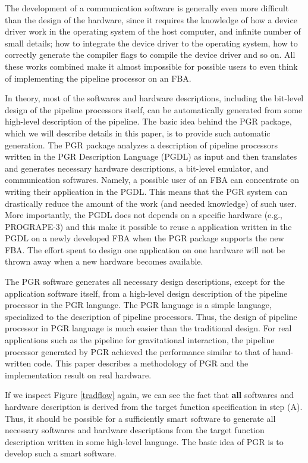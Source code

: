 \documentclass{llncs}
\begin{document}
The development of a communication software is generally even more
difficult than the design of the hardware, since it requires the
knowledge of how a device driver work in the operating
system of the host computer, and infinite number of small details;
how to integrate the device driver to the operating system, how to
correctly generate the compiler flags to compile the device driver and so on.
All these works combined make it almost impossible 
for possible users to even think of implementing the pipeline processor on an FBA.

In theory, most of the softwares and hardware descriptions,
including the bit-level design of the pipeline processors itself,
can be automatically generated from some high-level description of the
pipeline. The basic idea behind the PGR package,
which we will describe details in this paper,
is to provide such automatic generation.
The PGR package analyzes a description of pipeline processors
written in the PGR Description Language (PGDL) as input
and then translates and generates necessary hardware descriptions, 
a bit-level emulator, and communication softwares.
Namely, a possible user of an FBA can concentrate on writing their
application in the PGDL.
This means that the PGR system can drastically reduce the amount of
the work (and needed knowledge) of such user.
More importantly, the PGDL does not depends on a specific hardware
(e.g., PROGRAPE-3) and this make it possible to
reuse a application written in the PGDL on a newly developed FBA
when the PGR package supports the new FBA.
The effort spent to design one application on
one hardware will not be thrown away when a new hardware becomes available.

The PGR software generates all necessary design descriptions, except for
the application software itself, from a high-level design description
of the pipeline processor in the PGR language. The PGR language is a
simple language, specialized to the description of pipeline
processors. Thus, the design of pipeline processor in PGR language is
much easier than the traditional design. For real applications such as
the pipeline for gravitational interaction, the pipeline processor
generated by PGR achieved the performance similar to that of
hand-written code. 
This paper describes a methodology of PGR and the implementation result on real hardware.

If we inspect Figure \ref{tradflow} again, we can see the fact that
{\bfseries all} softwares and hardware description is derived from the
target function specification in step (A). Thus, it should be possible
for a sufficiently smart software to generate all necessary softwares
and hardware descriptions from the target function description written
in some high-level language. The basic idea of PGR is to develop such
a smart software.
\end{document}
